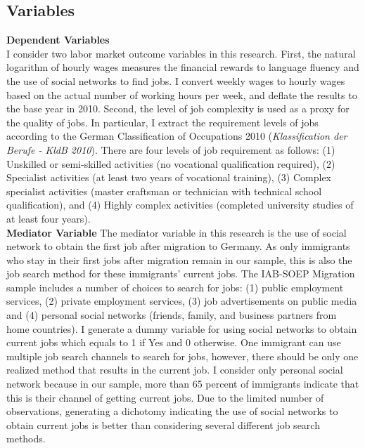 \documentclass[12pt,a4paper]{article}
\begin{document}
\subsection{Variables}
\textbf{Dependent Variables} \\
I consider two labor market outcome variables in this research. First, the natural logarithm of hourly wages measures the financial rewards to language fluency and the use of social networks to find jobs. I convert weekly wages to hourly wages based on the actual number of working hours per week, and deflate the results to the base year in 2010. Second, the level of job complexity is used as a proxy for the quality of jobs. In particular, I extract the requirement levels of jobs according to the German Classification of Occupations 2010 (\textit{Klassification der Berufe - KldB 2010}). There are four levels of job requirement as follows: (1) Unskilled or semi-skilled activities (no vocational qualification required), (2) Specialist activities (at least two years of vocational training), (3) Complex specialist activities (master craftsman or technician with technical school qualification), and (4) Highly complex activities (completed university studies of at least four years). \\

\textbf{Mediator Variable}
The mediator variable in this research is the use of social network to obtain the first job after migration to Germany. As only immigrants who stay in their first jobs after migration remain in our sample, this is also the job search method for these immigrants' current jobs. The IAB-SOEP Migration sample includes a number of choices to search for jobs: (1) public employment services, (2) private employment services, (3) job advertisements on public media and (4) personal social networks (friends, family, and business partners from home countries). I generate a dummy variable for using social networks to obtain current jobs which equals to 1 if Yes and 0 otherwise. One immigrant can use multiple job search channels to search for jobs, however, there should be only one realized method that results in the current job. I consider only personal social network because in our sample, more than 65 percent of immigrants indicate that this is their channel of getting current jobs. Due to the limited number of observations, generating a dichotomy indicating the use of social networks to obtain current jobs is better than considering several different job search methods. \\
\end{document}
